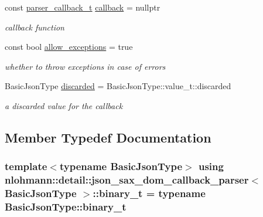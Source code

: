 \begin{DoxyCompactItemize}
const \hyperlink{classnlohmann_1_1detail_1_1json__sax__dom__callback__parser_a4f636086fa8e7cf26c35c8afd50903ce}{parser\+\_\+callback\+\_\+t} \hyperlink{classnlohmann_1_1detail_1_1json__sax__dom__callback__parser_a46a72dffd5be4a25602af00f0033c126}{callback} = nullptr
\begin{DoxyCompactList}\small\item\em callback function \end{DoxyCompactList}\item 
const bool \hyperlink{classnlohmann_1_1detail_1_1json__sax__dom__callback__parser_a0a1390c23e2a3da774d75c050f9b3f13}{allow\+\_\+exceptions} = true
\begin{DoxyCompactList}\small\item\em whether to throw exceptions in case of errors \end{DoxyCompactList}\item 
Basic\+Json\+Type \hyperlink{classnlohmann_1_1detail_1_1json__sax__dom__callback__parser_a8997ee6dc3bd39116b951465b946445e}{discarded} = Basic\+Json\+Type\+::value\+\_\+t\+::discarded
\begin{DoxyCompactList}\small\item\em a discarded value for the callback \end{DoxyCompactList}\end{DoxyCompactItemize}


\subsection{Member Typedef Documentation}
\subsubsection[{\texorpdfstring{binary\+\_\+t}{binary_t}}]{\setlength{\rightskip}{0pt plus 5cm}template$<$typename Basic\+Json\+Type$>$ using {\bf nlohmann\+::detail\+::json\+\_\+sax\+\_\+dom\+\_\+callback\+\_\+parser}$<$ Basic\+Json\+Type $>$\+::{\bf binary\+\_\+t} =  typename Basic\+Json\+Type\+::binary\+\_\+t}\hypertarget{classnlohmann_1_1detail_1_1json__sax__dom__callback__parser_a5af8493f830eeb1a79c69fc39ed54ef8}{}\label{classnlohmann_1_1detail_1_1json__sax__dom__callback__parser_a5af8493f830eeb1a79c69fc39ed54ef8}
